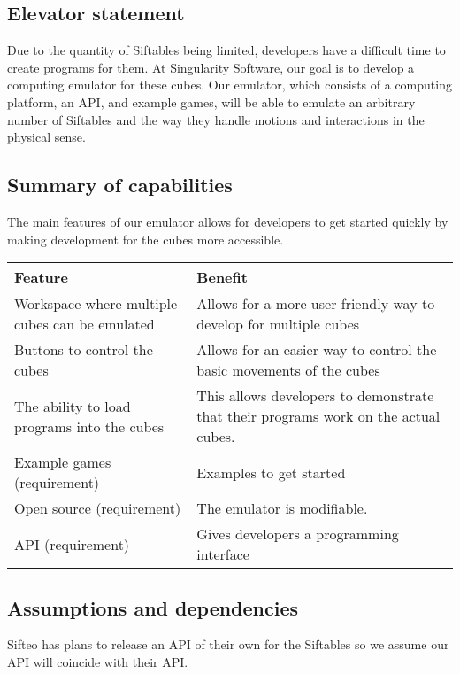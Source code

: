 \documentclass[12pt]{article}
\begin{document}
              \subsection{Elevator statement}
              Due to the quantity of Siftables being limited, developers have a difficult time to create programs for them.  At Singularity Software, our goal is to develop a computing emulator for these cubes.  Our emulator, which consists of a computing platform, an API, and example games, will be able to emulate an arbitrary number of Siftables and the way they handle motions and interactions in the physical sense.
\clearpage
              \subsection{Summary of capabilities}
              The main features of our emulator allows for developers to get started quickly by making development for the cubes more accessible.
              \begin{table}[h]
                \begin{tabular}{p{3in} | p{3in}}
                  \textbf{Feature} & \textbf{Benefit} \\ \hline
                  Workspace where multiple cubes can be emulated
                            & Allows for a more user-friendly  way to develop for multiple cubes \\ \hline
                  Buttons to control the cubes
                            & Allows for an easier way to control the basic movements of the cubes \\ \hline
                  The ability to load programs into the cubes
                            & This allows developers to demonstrate that their programs work on the actual cubes. \\ \hline
                  Example games (requirement)
                            & Examples to get started \\ \hline
                  Open source  (requirement)
                            & The emulator is modifiable. \\ \hline
                  API (requirement)
                            & Gives developers a programming interface
                \end{tabular}
              \end{table}

              \subsection{Assumptions and dependencies}
              Sifteo has plans to release an API of their own for the Siftables so we assume our API will coincide with their API. 
\end{document}
